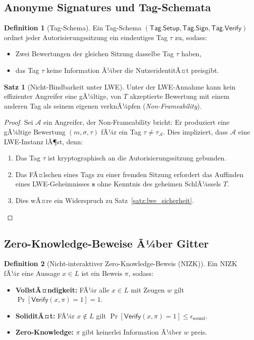 ﻿\documentclass[a4paper,12pt]{article}
\theoremstyle{definition}
\newtheorem{definition}{Definition}
\newtheorem{satz}{Satz}
\begin{document}
\subsection{Anonyme Signatures und Tag-Schemata}

\begin{definition}[Tag-Schema]
Ein Tag-Schema $(\mathsf{Tag.Setup}, \mathsf{Tag.Sign}, \mathsf{Tag.Verify})$ ordnet
jeder Autorisierungssitzung ein eindeutiges Tag $\tau$ zu, sodass:
\begin{itemize}
    \item Zwei Bewertungen der gleichen Sitzung dasselbe Tag $\tau$ haben,
    \item das Tag $\tau$ keine Information Ã¼ber die NutzeridentitÃ¤t preisgibt.
\end{itemize}
\end{definition}

\begin{satz}[Nicht-Bindbarkeit unter LWE]
\label{satz:non_frameability}
Unter der LWE-Annahme kann kein effizienter Angreifer
eine gÃ¼ltige, von $T$ akzeptierte Bewertung mit einem anderen Tag als seinem eigenen
verknÃ¼pfen (\emph{Non-Frameability}).
\end{satz}

\begin{proof}
Sei $\mathcal{A}$ ein Angreifer, der Non-Frameability bricht:
Er produziert eine gÃ¼ltige Bewertung $(m, \sigma, \tau)$ fÃ¼r ein Tag $\tau \neq \tau_{\mathcal{A}}$.
Dies impliziert, dass $\mathcal{A}$ eine LWE-Instanz lÃ¶st, denn:
\begin{enumerate}
    \item Das Tag $\tau$ ist kryptographisch an die Autorisierungssitzung gebunden.
    \item Das FÃ¤lschen eines Tags zu einer fremden Sitzung erfordert das Auffinden eines
          LWE-Geheimnisses $\mathbf{s}$ ohne Kenntnis des geheimen SchlÃ¼ssels $T$.
    \item Dies wÃ¤re ein Widerspruch zu Satz~\ref{satz:lwe_sicherheit}.
\end{enumerate}
\end{proof}

\subsection{Zero-Knowledge-Beweise Ã¼ber Gitter}

\begin{definition}[Nicht-interaktiver Zero-Knowledge-Beweis (NIZK)]
Ein NIZK fÃ¼r eine Aussage $x \in L$ ist ein Beweis $\pi$, sodass:
\begin{itemize}
    \item \textbf{VollstÃ¤ndigkeit:} FÃ¼r alle $x \in L$ mit Zeugen $w$ gilt $\Pr[\mathsf{Verify}(x, \pi) = 1] = 1$.
    \item \textbf{SoliditÃ¤t:} FÃ¼r $x \notin L$ gilt $\Pr[\mathsf{Verify}(x, \pi) = 1] \leq \epsilon_{\mathrm{sound}}$.
    \item \textbf{Zero-Knowledge:} $\pi$ gibt keinerlei Information Ã¼ber $w$ preis.
\end{itemize}
\end{definition}
\end{document}
